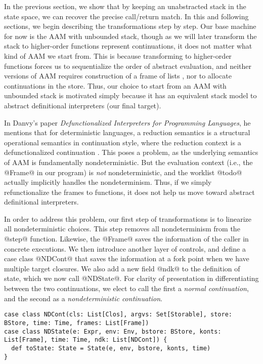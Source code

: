 \documentclass[acmsmall,review,anonymous]{acmart}\settopmatter{printfolios=true,printccs=false,printacmref=false}
\begin{document}
In the previous section, we show that by keeping an unabstracted stack in the state
space, we can recover the precise call/return match.
In this and following sections, we begin describing the transformations step by step.
Our base machine for now is the AAM with unbounded stack, though
as we will later transform the stack to higher-order functions
represent  continuations, it does not matter what kind of AAM we start from.
This is because transforming to higher-order functions forces us to sequentialize
the order of abstract evaluation, and neither versions of AAM requires construction of a frame of lists , nor to allocate continuations in the store.
Thus, our choice to start from an AAM with unbounded stack is motivated simply because it has an equivalent stack model to abstract definitional interpreters (our final target).


In Danvy's paper \textit{Defunctionalized Interpreters for Programming
  Languages}, he mentions that for deterministic languages, a reduction semantics
is a structural operational semantics in continuation style, where the reduction
context is a defunctionalized continuation \cite{Danvy:2008:DIP:1411204.1411206}.
This poses a problem, as the underlying semantics of AAM is fundamentally nondeterministic.
But the evaluation context (i.e., the @Frame@ in our program) is \emph{not}
nondeterministic, and the worklist @todo@ actually implicitly handles the nondeterminism.
Thus, if we simply refunctionalize the frames to functions, it does not help us move toward
abstract definitional interpreters.

In order to address this problem, our first step of transformations
is to linearize all nondeterministic choices.
This step removes all nondeterminism from the @step@ function.
Likewise, the @Frame@ saves the information of the caller in concrete executions.
We then introduce another layer of controls, and define a case class @NDCont@
that saves the information at a fork point when we have multiple target closures.
We also add a new field @ndk@ to the definition of state, which we now call @NDState@.
For clarity of presentation in differentiating between the two continuations, we elect to call
the first a \emph{normal continuation}, and the second as a \emph{nondeterministic
continuation}.

\begin{lstlisting}
case class NDCont(cls: List[Clos], argvs: Set[Storable], store: BStore, time: Time, frames: List[Frame])
case class NDState(e: Expr, env: Env, bstore: BStore, konts: List[Frame], time: Time, ndk: List[NDCont]) {
  def toState: State = State(e, env, bstore, konts, time)
}
\end{lstlisting}
\end{document}
